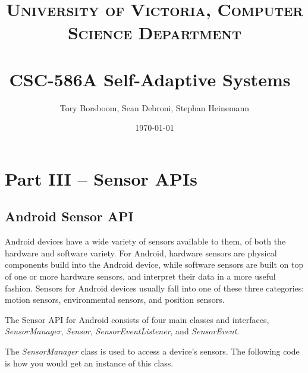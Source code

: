 \documentclass[paper=letter, fontsize=11pt]{scrartcl}
\title{	
\normalfont \normalsize 
\textsc{University of Victoria, Computer Science Department} \\ [25pt]
\horrule{0.5pt} \\[0.4cm]
\huge CSC-586A Self-Adaptive Systems\
\horrule{2pt} \\[0.5cm]
}
\author{Tory Borsboom, Sean Debroni, Stephan Heinemann}
\date{\normalsize\today}
\numberwithin{equation}{section}
\numberwithin{figure}{section}
\numberwithin{table}{section}
\begin{document}
\maketitle 

\section{Part III -- Sensor APIs}
\label{part3}

\subsection{Android Sensor API}
\label{android_gyroscope_api}
\par
Android devices have a wide variety of sensors available to them, of both the hardware and software variety. For Android, hardware sensors are physical components build into the Android device, while software sensors are built on top of one or more hardware sensors, and interpret their data in a more useful fashion. Sensors for Android devices usually fall into one of these three categories: motion sensors, environmental sensors, and position sensors.\\

\par
The Sensor API for Android consists of four main classes and interfaces, {\em SensorManager}, {\em Sensor}, {\em SensorEventListener}, and {\em SensorEvent}.\\

\par
The {\em SensorManager} class is used to access a device's sensors. The following code is how you would get an instance of this class.\\
\end{document}

